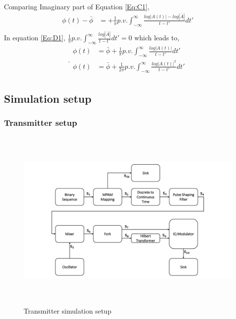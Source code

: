 Comparing Imaginary part of Equation \ref{Eq:C1},
\begin{equation}
\begin{split}
\phi(t)-\bar{\phi} &= + \frac{1}{\pi} p.v. \int_{-\infty}^{\infty} \frac{log|A(t)|-log|\bar{A}|}{t-t'} dt'\\
\end{split}
\label{Eq:D1}
\end{equation}
In equation \ref{Eq:D1}, $\frac{1}{\pi} p.v. \int_{-\infty}^{\infty} \frac{log|\bar{A}|}{t-t'} dt'=0$ which leads to,
\begin{equation}.
\begin{split}
\phi(t) &= \bar{\phi} + \frac{1}{\pi} p.v. \int_{-\infty}^{\infty} \frac{log|A(t)|}{t-t'} dt'\\
\phi(t) &= \bar{\phi} + \frac{1}{2\pi} p.v. \int_{-\infty}^{\infty} \frac{log|A(t)|^2}{t-t'} dt'\\
\end{split}
\label{Eq:E1}
\end{equation}
\newpage
\subsection{Simulation setup}
\subsubsection{Transmitter setup}
\begin{center}
\begin{figure}[h]
	\centering
	\includegraphics[width=1\textwidth, height=9cm]{./sdf/simplified_coherent_receiver/figures/Simulation_setup_Tx.pdf}
	\caption{Transmitter simulation setup}\label{Simulation_setup_Tx}
\end{figure}
\end{center}
